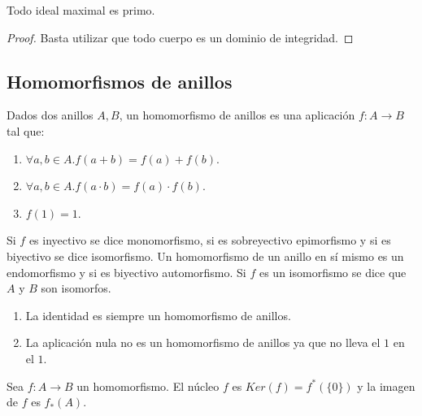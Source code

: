 \begin{corollary}
Todo ideal maximal es primo.
\end{corollary}
\begin{proof}
Basta utilizar que todo cuerpo es un dominio de integridad. 
\end{proof}


\subsection{Homomorfismos de anillos}

\begin{definition}
	Dados dos anillos $A,B$, un homomorfismo de anillos es una aplicación $f:A \to B$ tal que:
	
	\begin{enumerate}
		\item $\forall a,b \in A. f(a+b) = f(a) + f(b)$.
		\item $\forall a,b \in A. f(a \cdot b) = f(a) \cdot f(b)$.
		\item $f(1) = 1$.
	\end{enumerate}

	Si $f$ es inyectivo se dice monomorfismo, si es sobreyectivo epimorfismo y si es biyectivo se dice isomorfismo. Un homomorfismo de un anillo en sí mismo es un endomorfismo y si es biyectivo automorfismo. Si $f$ es un isomorfismo se dice que $A$ y $B$ son isomorfos. 
\end{definition}

\begin{example}
	\begin{enumerate}
		\item La identidad es siempre un homomorfismo de anillos.
		\item La aplicación nula no es un homomorfismo de anillos ya que no lleva el $1$ en el $1$. 
	\end{enumerate}
\end{example}

\begin{definition}
Sea $f:A \to B$ un homomorfismo. El núcleo $f$ es $Ker(f) = f^*(\{0\})$ y la imagen de $f$ es $f_*(A)$. 
\end{definition}

